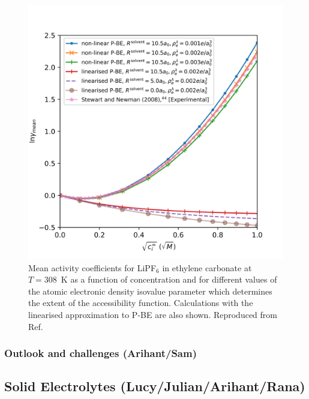 \documentclass[../main.tex]{subfiles}
\begin{document}
\begin{figure}
    \includegraphics[scale=1]{figures/lipf6.png}
    \caption{Mean activity coefficients for LiPF$_6$ in ethylene carbonate at $T=308$~K as a function of concentration and for different values of the atomic electronic density isovalue parameter which determines the extent of the accessibility function. Calculations with the linearised approximation to P-BE are also shown. Reproduced from Ref. }
    \label{fig:ac}
\end{figure}
    
\subsubsection{Outlook and challenges (Arihant/Sam)}

\subsection{Solid Electrolytes (Lucy/Julian/Arihant/Rana)}
\label{sec:solid_electrolytes}
\end{document}
